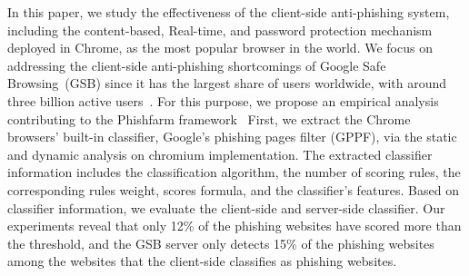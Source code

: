 In this paper, we study the effectiveness of the client-side anti-phishing system, including the content-based, Real-time, and password protection mechanism deployed in Chrome, as the most popular browser in the world. We focus on addressing the client-side anti-phishing shortcomings of Google Safe Browsing~(GSB) since it has the largest share of users worldwide, with around three billion active users~\cite{statcounterall}.
For this purpose, we propose an empirical analysis contributing to the Phishfarm framework~\cite{oest2019phishfarm}
First, we extract the Chrome browsers' built-in classifier, Google's phishing pages filter (GPPF), via the static and dynamic analysis on chromium implementation. 
The extracted classifier information includes the classification algorithm, the number of scoring rules, the corresponding rules weight, scores formula, and the classifier's features. 
Based on classifier information, we evaluate the client-side and server-side classifier. Our experiments reveal that only 12\%  of the phishing websites have scored more than the threshold, and the GSB server only detects 15\%  of the phishing websites among the websites that the client-side classifies as phishing websites. 

